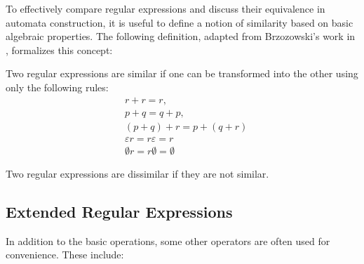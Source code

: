 To effectively compare regular expressions and discuss their equivalence in automata construction, it is useful to define a notion of similarity based on basic algebraic properties. The following definition, adapted from Brzozowski's work in \cite{brzozowski_derivatives}, formalizes this concept:
\begin{defn} 
	Two regular expressions are similar if one can be transformed into the other using only the following rules:
	\begin{align*}
		& r + r = r, \\
		& p + q = q + p, \\
		& (p + q) + r = p + (q + r) \\
		& \varepsilon r = r \varepsilon = r \\
		& \emptyset r = r \emptyset = \emptyset
	\end{align*}
	
	Two regular expressions are dissimilar if they are not similar.
\end{defn}







	
\subsection{Extended Regular Expressions}
\label{chap:prelim:extended_re}
In addition to the basic operations, some other operators are often used for convenience. These include:

